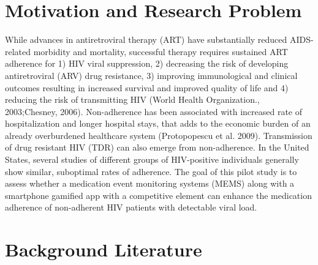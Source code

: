 \section{Motivation and Research Problem}

While advances in antiretroviral therapy (ART) have substantially reduced AIDS-related morbidity and mortality, successful therapy requires sustained ART adherence for 1) HIV viral suppression, 2) decreasing the risk of developing antiretroviral (ARV) drug resistance, 3) improving immunological and clinical outcomes resulting in increased survival and improved quality of life and 4) reducing the risk of transmitting HIV (World Health Organization.,  2003;Chesney,  2006). Non-adherence has been associated with increased rate of hospitalization and longer hospital stays, that adds to the economic burden of an already overburdened healthcare system (Protopopescu et al. 2009). Transmission of drug resistant HIV (TDR) can also emerge from non-adherence. In the United States, several studies of different groups of HIV-positive individuals generally show similar, suboptimal rates of adherence. The goal of this pilot study is to assess whether a medication event monitoring systems (MEMS) along with a smartphone gamified app with a competitive element can enhance the medication adherence of non-adherent HIV patients with detectable viral load.

\section{Background Literature}

